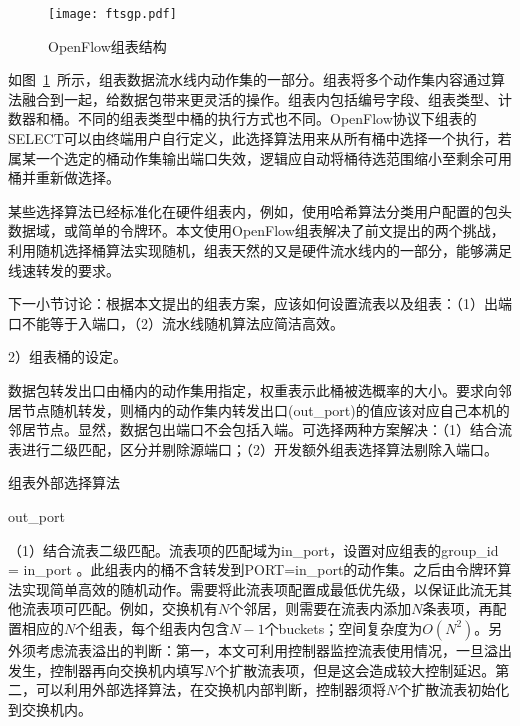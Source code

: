 \begin{figure}[!ht]
	\centering 
	\vspace{-1.5mm} 
	\texttt{[image: ftsgp.pdf]}
	\caption{OpenFlow组表结构} \label{fig:ftsgp}
\end{figure}

如图~\ref{fig:ftsgp}~所示，组表数据流水线内动作集的一部分。组表将多个动作集内容通过算法融合到一起，给数据包带来更灵活的操作。组表内包括编号字段、组表类型、计数器和桶。不同的组表类型中桶的执行方式也不同。OpenFlow协议下组表的SELECT可以由终端用户自行定义，此选择算法用来从所有桶中选择一个执行，若属某一个选定的桶动作集输出端口失效，逻辑应自动将桶待选范围缩小至剩余可用桶并重新做选择。

某些选择算法已经标准化在硬件组表内，例如，使用哈希算法分类用户配置的包头数据域，或简单的令牌环。本文使用OpenFlow组表解决了前文提出的两个挑战，利用随机选择桶算法实现随机，组表天然的又是硬件流水线内的一部分，能够满足线速转发的要求。

下一小节讨论：根据本文提出的组表方案，应该如何设置流表以及组表：（1）出端口不能等于入端口，（2）流水线随机算法应简洁高效。


2）组表桶的设定。

数据包转发出口由桶内的动作集用指定，权重表示此桶被选概率的大小。要求向邻居节点随机转发，则桶内的动作集内转发出口(out\_port)的值应该对应自己本机的邻居节点。显然，数据包出端口不会包括入端。可选择两种方案解决：（1）结合流表进行二级匹配，区分并剔除源端口；（2）开发额外组表选择算法剔除入端口。

\begin{algorithm}[!h]
	\caption{组表外部选择算法 \label{ftsa}}
	\IncMargin{2em}
	\DontPrintSemicolon
	
	
	\Return out\_port
	
\end{algorithm}

（1）结合流表二级匹配。流表项的匹配域为in\_port，设置对应组表的group\_id = in\_port 。此组表内的桶不含转发到PORT=in\_port的动作集。之后由令牌环算法实现简单高效的随机动作。需要将此流表项配置成最低优先级，以保证此流无其他流表项可匹配。例如，交换机有$ N $个邻居，则需要在流表内添加$ N $条表项，再配置相应的$ N $个组表，每个组表内包含$N-1$个buckets；空间复杂度为$O(N^2)$。另外须考虑流表溢出的判断：第一，本文可利用控制器监控流表使用情况，一旦溢出发生，控制器再向交换机内填写$ N $个扩散流表项，但是这会造成较大控制延迟。第二，可以利用外部选择算法，在交换机内部判断，控制器须将$ N $个扩散流表初始化到交换机内。

